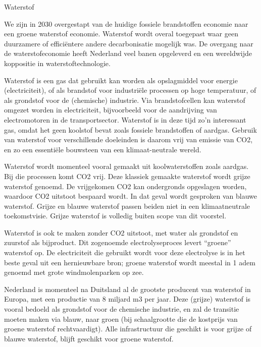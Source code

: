 \begin{voorstel}{Waterstof}

\begin{samenvatting}
We zijn in 2030 overgestapt van de huidige fossiele brandstoffen economie naar een groene waterstof economie. Waterstof wordt overal toegepast waar geen duurzamere of efficiëntere andere decarbonisatie mogelijk was. De overgang naar de waterstofeconomie heeft Nederland veel banen opgeleverd en een wereldwijde koppositie in waterstoftechnologie.
\end{samenvatting}

\begin{uitdaging}
Waterstof is een gas dat gebruikt kan worden als opslagmiddel voor energie (electriciteit), of als brandstof voor industriële processen op hoge temperatuur, of als grondstof voor de (chemische) industrie. Via brandstofcellen kan waterstof omgezet worden in electriciteit, bijvoorbeeld voor de aandrijving van electromotoren in de transportsector. Waterstof is in deze tijd zo’n interessant gas, omdat het geen koolstof bevat zoals fossiele brandstoffen of aardgas. Gebruik van waterstof voor verschillende doeleinden is daarom vrij van emissie van CO2, en zo een essentiële bouwsteen van een klimaat-neutrale wereld.

Waterstof wordt momenteel vooral gemaakt uit koolwaterstoffen zoals aardgas. Bij die processen komt CO2 vrij. Deze klassiek gemaakte waterstof wordt grijze waterstof genoemd. De vrijgekomen CO2 kan ondergronds opgeslagen worden, waardoor CO2 uitstoot bespaard wordt. In dat geval wordt gesproken van blauwe waterstof. Grijze en blauwe waterstof passen beiden niet in een klimaatneutrale toekomstvisie. Grijze waterstof is volledig buiten scope van dit voorstel. 

Waterstof is ook te maken zonder CO2 uitstoot, met water als grondstof en zuurstof als bijproduct. Dit zogenoemde electrolyseproces levert “groene” waterstof op. De electriciteit die gebruikt wordt voor deze electrolyse is in het beste geval uit een hernieuwbare bron; groene waterstof wordt meestal in 1 adem genoemd met grote windmolenparken op zee.

Nederland is momenteel na Duitsland al de grootste producent van waterstof in Europa, met een productie van 8 miljard m3 per jaar. Deze (grijze) waterstof is vooral bedoeld als grondstof voor de chemische industrie, en zal de transitie moeten maken via blauw, naar groen (bij schaalgrootte die de kostprijs van groene waterstof rechtvaardigt). Alle infrastructuur die geschikt is voor grijze of blauwe waterstof, blijft geschikt voor groene waterstof.


\end{uitdaging}
\end{voorstel}
